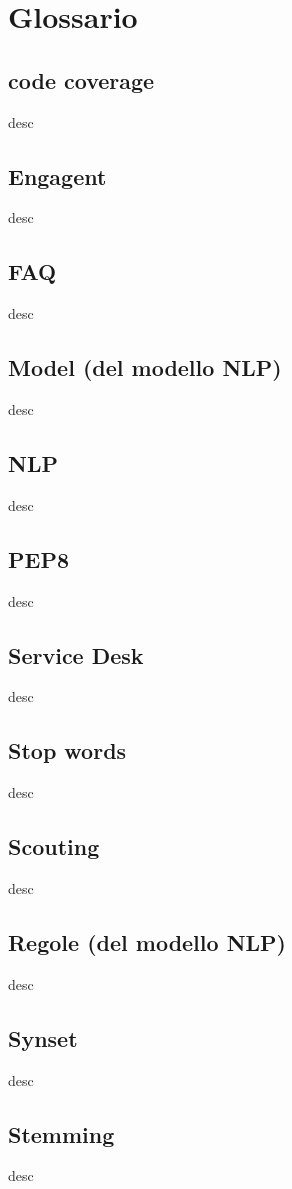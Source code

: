 \chapter{Glossario}


\section*{code coverage}
desc

\section*{Engagent}
desc



\section*{FAQ}
desc

\section*{Model (del modello NLP)}
desc


\section*{NLP}
desc

\section*{PEP8}
desc

\section*{Service Desk}
desc



\section*{Stop words}
desc


\section*{Scouting}
desc


\section*{Regole (del modello NLP)}
desc



\section*{Synset}
desc


\section*{Stemming}
desc